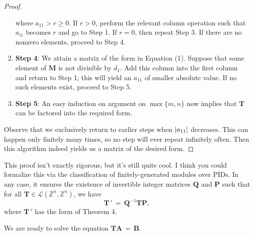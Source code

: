 \documentclass[11pt]{article}
\renewcommand{\vec}[1]{\mathbf{#1}}
\newcommand{\mat}[1]{\mathbf{#1}}
\begin{document}
\begin{adjustwidth}{0.5cm}{}
\begin{proof}
\begin{enumerate}
\[      \]
      where $a_{11} > r \ge 0$. If $r > 0$, perform the relevant column operation such that $a_{i1}$ becomes $r$ and go to Step 1. If $r = 0$, then repeat Step 3. If there are no nonzero elements, proceed to Step 4.
      \item \textbf{Step 4}: We attain a matrix of the form in Equation (1). Suppose that some element of $\mat{M}$ is not divisible by $d_{1}$. Add this column into the first column and return to Step 1; this will yield an $a_{11}$ of smaller absolute value. If no such elements exist, proceed to Step 5.
      \item \textbf{Step 5}: An easy induction on argument on $\max \{ m, n \}$ now implies that $\mat{T}$ can be factored into the required form.
    \end{enumerate}
    Observe that we exclusively return to earlier steps when $\abs{a_{11}}$ decreases. This can happen only finitely many times, so no step will ever repeat infinitely often. Then this algorithm indeed yields us a matrix of the desired form.
  \end{proof}
\end{adjustwidth}

This proof isn't exactly rigorous, but it's still quite cool. I think you could formalize this via the classification of finitely-generated modules over PIDs. In any case, it ensures the existence of invertible integer matrices $\mat{Q}$ and $\mat{P}$ such that for all $\mat{T} \in \mathcal{L}(\mathbb{Z}^{n}, \mathbb{Z}^{n})$, we have
\[
  \mat{T} \, ' \, = \, \mat{Q}^{-1}\mat{T}\mat{P},
\]
where $\mat{T} \, '$ has the form of Theorem 4.

\newpage

We are ready to solve the equation $\mat{T} \vec{A} \, = \, \vec{B}$.
\end{document}
